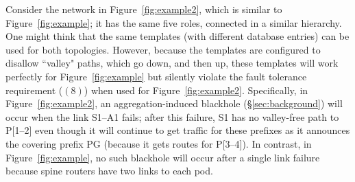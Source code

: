 \documentclass[numbers, 10pt, preprint]{sigplanconf}
\newcommand{\ratul}[1]{\textcolor{blue}{[ratul: #1]}}
\newcommand{\dpw}[1]{\textcolor{tmlblue}{[dpw: #1]}}
\begin{document}
Consider the network in Figure~\ref{fig:example2}, which is similar to Figure~\ref{fig:example}; it has the same five roles, connected in a similar hierarchy. One might think that the same templates (with different database entries) can be used for both topologies. However, because the templates are configured to disallow ``valley" paths, which go down, and then up, these templates will work perfectly for Figure~\ref{fig:example} but silently violate the fault tolerance requirement ($(8)$) when used for Figure~\ref{fig:example2}.  Specifically, in Figure~\ref{fig:example2}, an aggregation-induced blackhole (\S\ref{sec:background}) will occur when the link S1--A1 fails; after this failure, S1 has no valley-free path to P[1--2] even though it will continue to get traffic for these prefixes as it announces the covering prefix PG (because it gets routes for P[3--4]). In contrast, in Figure~\ref{fig:example}, no such blackhole will occur after a single link failure because spine routers have two links to each pod.

\end{document}

